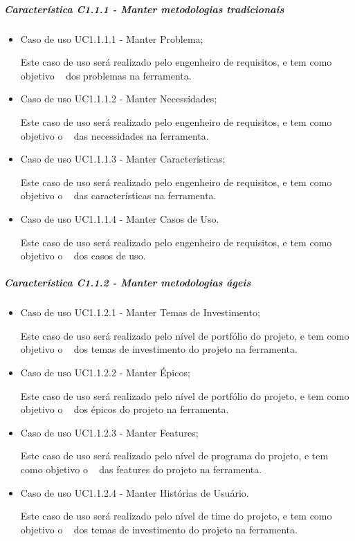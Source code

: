 	\subparagraph{Característica C1.1.1 - Manter metodologias tradicionais}
		\begin{itemize}
			
			\item Caso de uso UC1.1.1.1 - Manter Problema;

				Este caso de uso será realizado pelo engenheiro de requisitos, e tem como objetivo \CRUD~ dos problemas na ferramenta.
			
			\item Caso de uso UC1.1.1.2 - Manter Necessidades;

				Este caso de uso será realizado pelo engenheiro de requisitos, e tem como objetivo o \CRUD~ das necessidades na ferramenta.
			
			\item Caso de uso UC1.1.1.3 - Manter Características;

				Este caso de uso será realizado pelo engenheiro de requisitos, e tem como objetivo o \CRUD~ das características na ferramenta.
			
			\item Caso de uso UC1.1.1.4 - Manter Casos de Uso.

				Este caso de uso será realizado pelo engenheiro de requisitos, e tem como objetivo o \CRUD~ dos casos de uso.
		\end{itemize}
	
	\subparagraph{Característica C1.1.2 - Manter metodologias ágeis}
		\begin{itemize}
			
			\item Caso de uso UC1.1.2.1 - Manter Temas de Investimento;

				Este caso de uso será realizado pelo nível de portfólio do projeto, e tem como objetivo o \CRUD~ dos temas de investimento do projeto na ferramenta.
			
			\item Caso de uso UC1.1.2.2 - Manter Épicos;

				Este caso de uso será realizado pelo nível de portfólio do projeto, e tem como objetivo o \CRUD~ dos épicos do projeto na ferramenta.
			
			\item Caso de uso UC1.1.2.3 - Manter Features;

				Este caso de uso será realizado pelo nível de programa do projeto, e tem como objetivo o \CRUD~ das features do projeto na ferramenta.
			
			\item Caso de uso UC1.1.2.4 - Manter Histórias de Usuário.

				Este caso de uso será realizado pelo nível de time do projeto, e tem como objetivo o \CRUD~ dos temas de investimento do projeto na ferramenta.
		\end{itemize}

